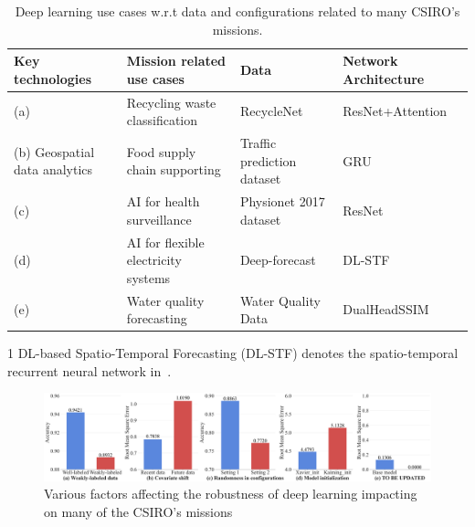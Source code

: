 \begin{table}[t]
    \centering
    \caption{Deep learning use cases w.r.t data and  
 configurations related to many   CSIRO's missions.}
\footnotesize
 \begin{threeparttable}
    \begin{tabular}{llll}
        \toprule
        \textbf{Key technologies} &\textbf{Mission related use cases} &  \textbf{Data} & \textbf{Network Architecture}   \\
        \midrule
        (a) & Recycling waste classification & RecycleNet~\cite{trashnet} & ResNet+Attention~\cite{RecycleNet_trash_images} \\ 
        (b) Geospatial data analytics & Food supply chain supporting  & Traffic prediction dataset~\cite{KaggleTraffic} & GRU~\cite{chung2014empirical} \\
        (c) & AI for health surveillance & Physionet 2017 dataset~\cite{clifford2017af} & ResNet~\cite{hannun2019cardiologist} \\
        (d) & AI for flexible electricity systems & Deep-forecast~\cite{ghaderi2017deepforecast} & DL-STF\tnote{1}~\cite{ghaderi2017deepforecast} \\
        (e) & Water quality forecasting & Water Quality Data~\cite{zhang2019ssim} & DualHeadSSIM~\cite{zhang2021dual} \\
        \bottomrule
        
    \end{tabular}
    \begin{tablenotes}
    \item[1] DL-based Spatio-Temporal Forecasting (DL-STF) denotes the spatio-temporal recurrent neural network in~\cite{ghaderi2017deepforecast}.
  \end{tablenotes}
    \end{threeparttable}
\label{tab:existing}
\end{table} 

\begin{figure}[t]
    \centering
    \includegraphics[width=\linewidth]{fig/factors.pdf}
    \caption{Various factors affecting the robustness of deep learning impacting on many of the CSIRO's missions  }
    \label{fig:motivation}
\end{figure}

